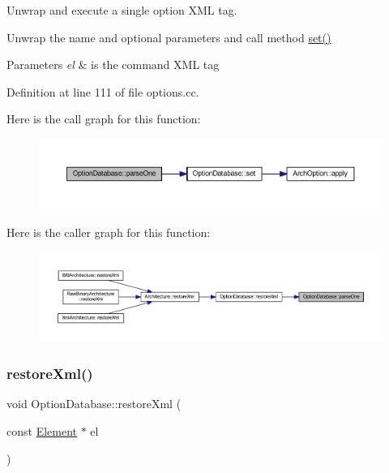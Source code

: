 Unwrap and execute a single option X\+ML tag. 

Unwrap the name and optional parameters and call method \mbox{\hyperlink{class_option_database_aaec7650371cbbb2a17a88393347c9ffc}{set()}} 
\begin{DoxyParams}{Parameters}
{\em el} & is the command X\+ML tag \\
\hline
\end{DoxyParams}


Definition at line 111 of file options.\+cc.

Here is the call graph for this function\+:
\nopagebreak
\begin{figure}[H]
\begin{center}
\leavevmode
\includegraphics[width=350pt]{class_option_database_ae8bf1e8bf96b3bbb863ddd6f99214d5b_cgraph}
\end{center}
\end{figure}
Here is the caller graph for this function\+:
\nopagebreak
\begin{figure}[H]
\begin{center}
\leavevmode
\includegraphics[width=350pt]{class_option_database_ae8bf1e8bf96b3bbb863ddd6f99214d5b_icgraph}
\end{center}
\end{figure}
\mbox{\label{class_option_database_afe0ea0f1c7a7cd2591ac159027082149}} 
\subsubsection{\texorpdfstring{restoreXml()}{restoreXml()}}
{\footnotesize\ttfamily void Option\+Database\+::restore\+Xml (\begin{DoxyParamCaption}\item[{const \mbox{\hyperlink{class_element}{Element}} $\ast$}]{el }\end{DoxyParamCaption})}



